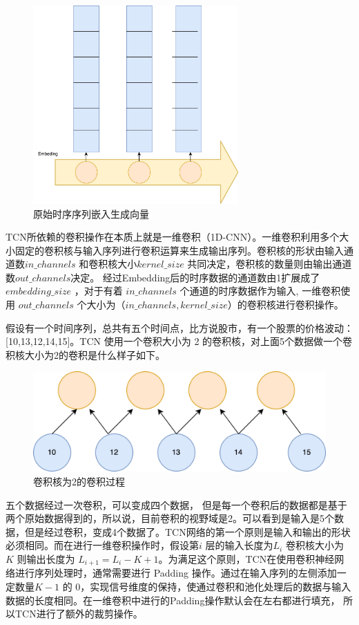 \begin{figure}[htbp]
  \centering
  \includegraphics[width=0.7\textwidth]{figures/embedding.png}
  \caption{原始时序序列嵌入生成向量}
\end{figure}

TCN所依赖的卷积操作在本质上就是一维卷积（1D-CNN）。一维卷积利用多个大小固定的卷积核与输入序列进行卷积运算来生成输出序列。卷积核的形状由输入通道数$in\_channels$ 和卷积核大小$kernel\_size$ 共同决定，卷积核的数量则由输出通道数$out\_channels$决定。
经过Embedding后的时序数据的通道数由1扩展成了$embedding\_size$ ，对于有着 $in\_channels$ 个通道的时序数据作为输入, 一维卷积使用 $out\_channels$ 个大小为（$in\_channels, kernel\_size$）的卷积核进行卷积操作。

假设有一个时间序列，总共有五个时间点，比方说股市，有一个股票的价格波动：[10,13,12,14,15]。TCN 使用一个卷积大小为 2 的卷积核，对上面5个数据做一个卷积核大小为2的卷积是什么样子如下。

\begin{figure}[htbp]
  \centering
  \includegraphics[width=.9\textwidth]{figures/convolution_1.png}
  \caption{卷积核为2的卷积过程}
\end{figure}

五个数据经过一次卷积，可以变成四个数据，
但是每一个卷积后的数据都是基于两个原始数据得到的，所以说，目前卷积的视野域是2。可以看到是输入是5个数据，但是经过卷积，变成4个数据了。TCN网络的第一个原则是输入和输出的形状必须相同。而在进行一维卷积操作时，假设第$i$ 层的输入长度为$L_i$ 卷积核大小为 $K$ 则输出长度为 $L_{i+1} = L_{i} - K + 1$。为满足这个原则，TCN在使用卷积神经网络进行序列处理时，通常需要进行 Padding 操作。通过在输入序列的左侧添加一定数量$K-1$ 的 0，实现信号维度的保持，使通过卷积和池化处理后的数据与输入数据的长度相同。在一维卷积中进行的Padding操作默认会在左右都进行填充，
所以TCN进行了额外的裁剪操作。

